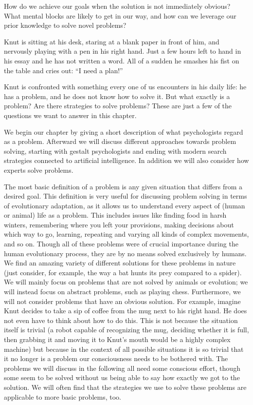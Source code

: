 \documentclass[
]{krantz}
\begin{document}
How do we achieve our goals when the solution is not immediately obvious? What mental blocks are likely to get in our way, and how can we leverage our prior knowledge to solve novel problems?

Knut is sitting at his desk, staring at a blank paper in front of him, and nervously playing with a pen in his right hand. Just a few hours left to hand in his essay and he has not written a word. All of a sudden he smashes his fist on the table and cries out: ``I need a plan!''

Knut is confronted with something every one of us encounters in his daily life: he has a problem, and he does not know how to solve it. But what exactly is a problem? Are there strategies to solve problems? These are just a few of the questions we want to answer in this chapter.

We begin our chapter by giving a short description of what psychologists regard as a problem. Afterward we will discuss different approaches towards problem solving, starting with gestalt psychologists and ending with modern search strategies connected to artificial intelligence. In addition we will also consider how experts solve problems.

The most basic definition of a problem is any given situation that differs from a desired goal. This definition is very useful for discussing problem solving in terms of evolutionary adaptation, as it allows us to understand every aspect of (human or animal) life as a problem. This includes issues like finding food in harsh winters, remembering where you left your provisions, making decisions about which way to go, learning, repeating and varying all kinds of complex movements, and so on. Though all of these problems were of crucial importance during the human evolutionary process, they are by no means solved exclusively by humans. We find an amazing variety of different solutions for these problems in nature (just consider, for example, the way a bat hunts its prey compared to a spider). We will mainly focus on problems that are not solved by animals or evolution; we will instead focus on abstract problems, such as playing chess. Furthermore, we will not consider problems that have an obvious solution. For example, imagine Knut decides to take a sip of coffee from the mug next to his right hand. He does not even have to think about how to do this. This is not because the situation itself is trivial (a robot capable of recognizing the mug, deciding whether it is full, then grabbing it and moving it to Knut's mouth would be a highly complex machine) but because in the context of all possible situations it is so trivial that it no longer is a problem our consciousness needs to be bothered with. The problems we will discuss in the following all need some conscious effort, though some seem to be solved without us being able to say how exactly we got to the solution. We will often find that the strategies we use to solve these problems are applicable to more basic problems, too.
\end{document}
